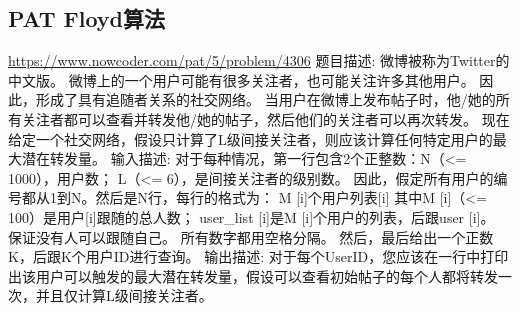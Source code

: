 \subsection{PAT Floyd算法}
\url{https://www.nowcoder.com/pat/5/problem/4306}
题目描述:\newline
微博被称为Twitter的中文版。 微博上的一个用户可能有很多关注者，也可能关注许多其他用户。 因此，形成了具有追随者关系的社交网络。 当用户在微博上发布帖子时，他/她的所有关注者都可以查看并转发他/她的帖子，然后他们的关注者可以再次转发。 现在给定一个社交网络，假设只计算了L级间接关注者，则应该计算任何特定用户的最大潜在转发量。\newline
输入描述:\newline
对于每种情况，第一行包含2个正整数：N（<= 1000），用户数； L（<= 6），是间接关注者的级别数。 \newline
因此，假定所有用户的编号都从1到N。然后是N行，每行的格式为：\newline
M [i]个用户列表[i]
其中M [i]（<= 100）是用户[i]跟随的总人数； user\_list [i]是M [i]个用户的列表，后跟user [i]。 保证没有人可以跟随自己。 所有数字都用空格分隔。
然后，最后给出一个正数K，后跟K个用户ID进行查询。\newline
输出描述:\newline
对于每个UserID，您应该在一行中打印出该用户可以触发的最大潜在转发量，假设可以查看初始帖子的每个人都将转发一次，并且仅计算L级间接关注者。\newline

